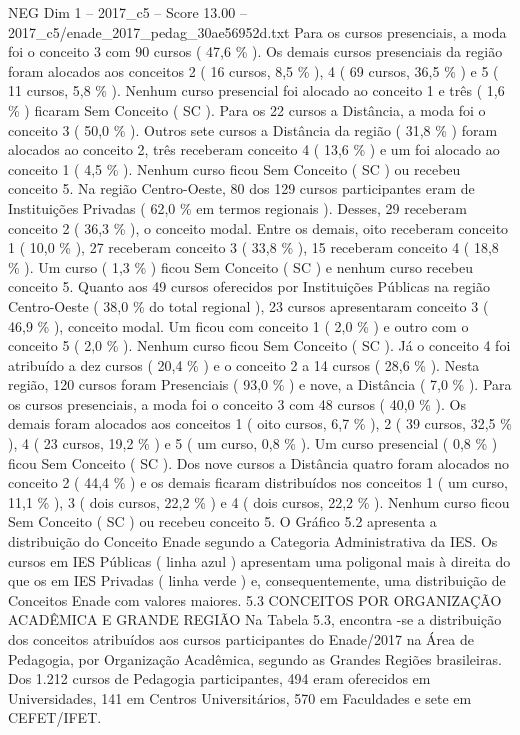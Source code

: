 \begin{textsample}{NEG Dim 1 – 2017\_c5 – Score 13.00 – 2017\_c5/enade\_2017\_pedag\_30ae56952d.txt}
Para os cursos presenciais, a moda foi o conceito 3 com 90 cursos ( 47,6 \% ).
Os demais cursos presenciais da região foram alocados aos conceitos 2 ( 16 cursos, 8,5 \% ), 4 ( 69 cursos, 36,5 \% ) e 5 ( 11 cursos, 5,8 \% ).
Nenhum curso presencial foi alocado ao conceito 1 e três ( 1,6 \% ) ficaram Sem Conceito ( SC ).
Para os 22 cursos a Distância, a moda foi o conceito 3 ( 50,0 \% ).
Outros sete cursos a Distância da região ( 31,8 \% ) foram alocados ao conceito 2, três receberam conceito 4 ( 13,6 \% ) e um foi alocado ao conceito 1 ( 4,5 \% ).
Nenhum curso ficou Sem Conceito ( SC ) ou recebeu conceito 5.
Na região Centro-Oeste, 80 dos 129 cursos participantes eram de Instituições Privadas ( 62,0 \% em termos regionais ).
Desses, 29 receberam conceito 2 ( 36,3 \% ), o conceito modal.
Entre os demais, oito receberam conceito 1 ( 10,0 \% ), 27 receberam conceito 3 ( 33,8 \% ), 15 receberam conceito 4 ( 18,8 \% ).
Um curso ( 1,3 \% ) ficou Sem Conceito ( SC ) e nenhum curso recebeu conceito 5.
Quanto aos 49 cursos oferecidos por Instituições Públicas na região Centro-Oeste ( 38,0 \% do total regional ), 23 cursos apresentaram conceito 3 ( 46,9 \% ), conceito modal.
Um ficou com conceito 1 ( 2,0 \% ) e outro com o conceito 5 ( 2,0 \% ).
Nenhum curso ficou Sem Conceito ( SC ).
Já o conceito 4 foi atribuído a dez cursos ( 20,4 \% ) e o conceito 2 a 14 cursos ( 28,6 \% ).
Nesta região, 120 cursos foram Presenciais ( 93,0 \% ) e nove, a Distância ( 7,0 \% ).
Para os cursos presenciais, a moda foi o conceito 3 com 48 cursos ( 40,0 \% ).
Os demais foram alocados aos conceitos 1 ( oito cursos, 6,7 \% ), 2 ( 39 cursos, 32,5 \% ), 4 ( 23 cursos, 19,2 \% ) e 5 ( um curso, 0,8 \% ).
Um curso presencial ( 0,8 \% ) ficou Sem Conceito ( SC ).
Dos nove cursos a Distância quatro foram alocados no conceito 2 ( 44,4 \% ) e os demais ficaram distribuídos nos conceitos 1 ( um curso, 11,1 \% ), 3 ( dois cursos, 22,2 \% ) e 4 ( dois cursos, 22,2 \% ).
Nenhum curso ficou Sem Conceito ( SC ) ou recebeu conceito 5.
O Gráfico 5.2 apresenta a distribuição do Conceito Enade segundo a Categoria Administrativa da IES.
Os cursos em IES Públicas ( linha azul ) apresentam uma poligonal mais à direita do que os em IES Privadas ( linha verde ) e, consequentemente, uma distribuição de Conceitos Enade com valores maiores. 5.3 CONCEITOS POR ORGANIZAÇÃO ACADÊMICA E GRANDE REGIÃO Na Tabela 5.3, encontra -se a distribuição dos conceitos atribuídos aos cursos participantes do Enade/2017 na Área de Pedagogia, por Organização Acadêmica, segundo as Grandes Regiões brasileiras.
Dos 1.212 cursos de Pedagogia participantes, 494 eram oferecidos em Universidades, 141 em Centros Universitários, 570 em Faculdades e sete em CEFET/IFET.

\end{textsample}
